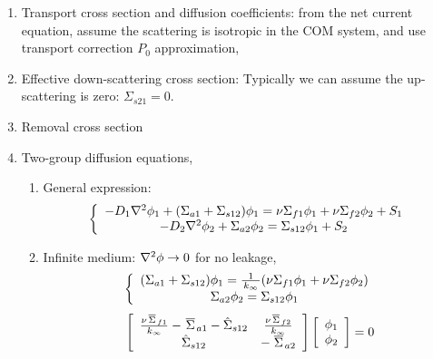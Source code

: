\documentclass{school-22.211-notes}
\begin{document}
\clearpage
{} 
\begin{enumerate}
\item Transport cross section and diffusion coefficients: from the net current equation, assume the scattering is isotropic in the COM system, and use transport correction $P_0$ approximation, 

\item Effective down-scattering cross section: 
  Typically we can assume the up-scattering is zero: $\Sigma_{s21}  = 0$.

\item Removal cross section

\item Two-group diffusion equations,
  \begin{enumerate}
    \item General expression: 
      \begin{align}
        \left\{ \begin{array}{c}
          - D_1 \nabla^2 \phi_1 + (\Sigma_{a1} + \Sigma_{s12}) \phi_1 = \nu \Sigma_{f1} \phi_1 + \nu \Sigma_{f2} \phi_2 + S_1  \\
          - D_2 \nabla^2 \phi_2 + \Sigma_{a2} \phi_2 = \Sigma_{s12} \phi_1 + S_2
        \end{array} \right. 
      \end{align}

      \item Infinite medium: $\nabla^2 \phi \to 0$ for no leakage,
       \begin{align}
         \left\{ \begin{array}{c}
         (\Sigma_{a1} + \Sigma_{s12} ) \phi_1 = \frac{1}{\left. k_{\infty} \right.} ( \nu \Sigma_{f1} \phi_1 + \nu \Sigma_{f2} \phi_2 )   \\
      \Sigma_{a2} \phi_2 = \Sigma_{s12} \phi_1
      \end{array} \right. 
         \end{align}
      \begin{align}
        \left[ \begin{array}{cc} 
            \frac{\nu \left.\overline{\Sigma} \right._{f1}}{\left. k_{\infty} \right.} -  \left.\overline{\Sigma} \right._{a1}  - \hat{\Sigma}_{s12} & \frac{\nu \left.\overline{\Sigma} \right._{f2}}{\left. k_{\infty} \right.}   \\
            \hat{\Sigma}_{s12} &  - \left.\overline{\Sigma} \right._{a2}  
          \end{array} \right] 
        \left[ \begin{array}{c} \phi_1 \\ \phi_2 \end{array} \right] = 0
      \end{align}


\end{enumerate}
\end{enumerate}
\end{document}
